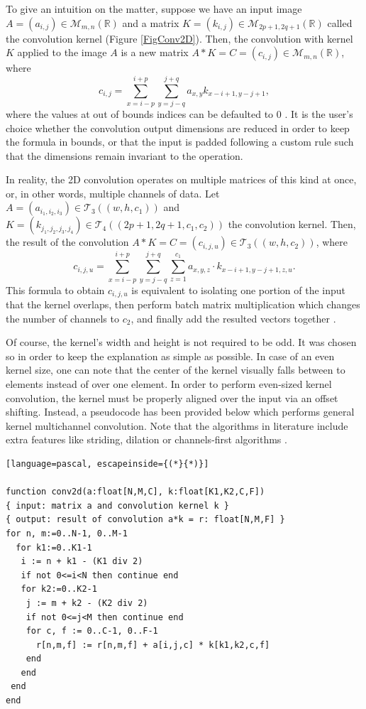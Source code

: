 To give an intuition on the matter, suppose we have an input image $A=(a_{i,j})\in\mathcal{M}_{m,n}(\mathbb{R})$ and a matrix $K=(k_{i,j})\in\mathcal{M}_{2p+1,2q+1}(\mathbb{R})$ called the convolution kernel (Figure \ref{FigConv2D}). Then, the convolution with kernel $K$ applied to the image $A$ is a new matrix $A * K = C=(c_{i,j})\in\mathcal{M}_{m,n}(\mathbb{R})$, where
$$c_{i,j} = \sum_{x=i-p}^{i+p}\sum_{y=j-q}^{j+q} a_{x,y} k_{x-i+1, y-j+1} , $$
where the values at out of bounds indices can be defaulted to $0$ \cite{D2l}. It is the user's choice whether the convolution output dimensions are reduced in order to keep the formula in bounds, or that the input is padded following a custom rule such that the dimensions remain invariant to the operation.

In reality, the 2D convolution operates on multiple matrices of this kind at once, or, in other words, multiple channels of data. Let $A=(a_{i_1,i_2,i_3})\in\mathcal{T}_3((w,h,c_1))$ and $K=(k_{j_1,j_2,j_3,j_4})\in\mathcal{T}_4((2p+1,2q+1,c_1,c_2))$ the convolution kernel. Then, the result of the convolution $A*K = C=(c_{i,j,u})\in\mathcal{T}_3((w,h,c_2))$, where
$$c_{i,j,u}=\sum_{x=i-p}^{i+p} \sum_{y=j-q}^{j+q} \sum_{z=1}^{c_1} a_{x,y,z}\cdot k_{x-i+1, y-j+1,z,u}.$$
This formula to obtain $c_{i,j,u}$ is equivalent to isolating one portion of the input that the kernel overlaps, then perform batch matrix multiplication which changes the number of channels to $c_2$, and finally add the resulted vectors together \cite{D2l}.

Of course, the kernel's width and height is not required to be odd. It was chosen so in order to keep the explanation as simple as possible. In case of an even kernel size, one can note that the center of the kernel visually falls between to elements instead of over one element. In order to perform even-sized kernel convolution, the kernel must be properly aligned over the input via an offset shifting. Instead, a pseudocode has been provided below which performs general kernel multichannel convolution. Note that the algorithms in literature include extra features like striding, dilation or channels-first algorithms \cite{D2l}.

\begin{lstlisting}[language=pascal, escapeinside={(*}{*)}]

function conv2d(a:float[N,M,C], k:float[K1,K2,C,F]) 
{ input: matrix a and convolution kernel k }
{ output: result of convolution a*k = r: float[N,M,F] }
for n, m:=0..N-1, 0..M-1 
  for k1:=0..K1-1
   i := n + k1 - (K1 div 2)
   if not 0<=i<N then continue end
   for k2:=0..K2-1
    j := m + k2 - (K2 div 2)
    if not 0<=j<M then continue end
    for c, f := 0..C-1, 0..F-1     
      r[n,m,f] := r[n,m,f] + a[i,j,c] * k[k1,k2,c,f]
    end
   end
 end 
end
\end{lstlisting}


